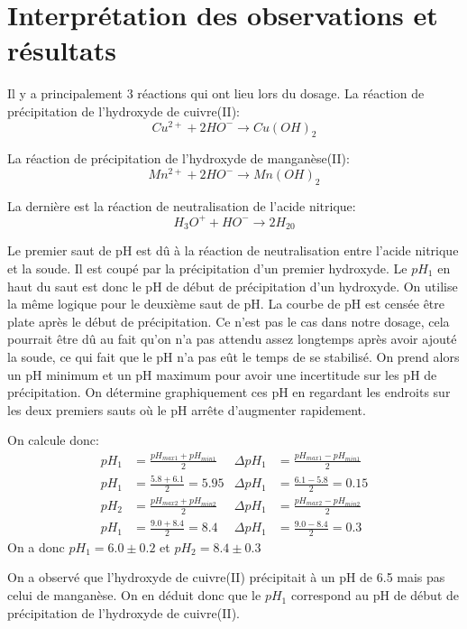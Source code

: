 \documentclass[12pt]{article}
\begin{document}
\section{Interprétation des observations et résultats}

Il y a principalement 3 réactions qui ont lieu lors du dosage. La réaction de précipitation de l'hydroxyde de cuivre(II):
\begin{equation}
Cu^{2+} + 2 H O^- \longrightarrow Cu(OH)_2
\end{equation}

La réaction de précipitation de l'hydroxyde de manganèse(II):
\begin{equation}
Mn^{2+} + 2 H O^- \longrightarrow Mn(OH)_2
\end{equation}

La dernière est la réaction de neutralisation de l'acide nitrique:
\begin{equation}
H_3 O^+ + H O^- \longrightarrow 2 H_20
\end{equation}

Le premier saut de pH est dû à la réaction de neutralisation entre l'acide nitrique et la soude. Il est coupé par la précipitation d'un premier hydroxyde. Le $pH_1$ en haut du saut est donc le pH de début de précipitation d'un hydroxyde. On utilise la même logique pour le deuxième saut de pH. La courbe de pH est censée être plate après le début de précipitation. Ce n'est pas le cas dans notre dosage, cela pourrait être dû au fait qu'on n'a pas attendu assez longtemps après avoir ajouté la soude, ce qui fait que le pH n'a pas eût le temps de se stabilisé. On prend alors un pH minimum et un pH maximum pour avoir une incertitude sur les pH de précipitation. On détermine graphiquement ces pH en regardant les endroits sur les deux premiers sauts où le pH arrête d'augmenter rapidement.

On calcule donc:
\begin{align*}
pH_1&=\frac{pH_{max1}+pH_{min1}}{2} & \Delta pH_1 &= \frac{pH_{max1} - pH_{min1}}{2} \\
pH_1&=\frac{5.8+6.1}{2}=5.95 & \Delta pH_1 &= \frac{6.1- 5.8}{2}=0.15 \\
pH_2&=\frac{pH_{max2}+pH_{min2}}{2} & \Delta pH_1 &= \frac{pH_{max2} - pH_{min2}}{2} \\
pH_1&=\frac{9.0+8.4}{2}=8.4 & \Delta pH_1 &= \frac{9.0-8.4}{2}=0.3
\end{align*}
On a donc $pH_1=6.0 \pm 0.2$ et $pH_2=8.4 \pm 0.3$

On a observé que l'hydroxyde de cuivre(II) précipitait à un pH de 6.5 mais pas celui de manganèse. On en déduit donc que le $pH_1$ correspond au pH de début de précipitation de l'hydroxyde de cuivre(II).
\end{document}
